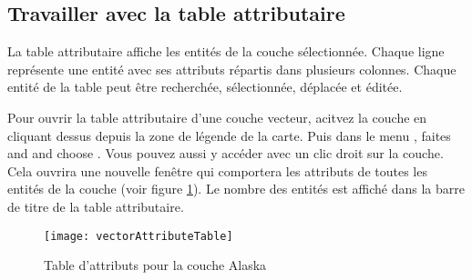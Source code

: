 \subsection{Travailler avec la table attributaire}\label{sec:attribute table}

La table attributaire affiche les entités de la couche sélectionnée. Chaque ligne représente une entité avec ses attributs répartis dans  plusieurs colonnes. Chaque entité de la table peut être recherchée, sélectionnée, déplacée et éditée.

Pour ouvrir la table attributaire d'une couche vecteur, acitvez la couche en cliquant dessus depuis la zone de légende de la carte. Puis dans le menu  , faites and and choose . Vous pouvez aussi y accéder avec un clic droit sur la couche. Cela ouvrira une nouvelle fenêtre qui comportera les attributs de toutes les entités de la couche (voir figure \ref{fig:attributetable}). Le nombre des entités est affiché dans la barre de titre de la table attributaire.

\begin{figure}[ht]
   \begin{center}
   \texttt{[image: vectorAttributeTable]}
    \caption{Table d'attributs pour la couche Alaska \nixcaption}\label{fig:attributetable}
\end{center} 
\end{figure}



